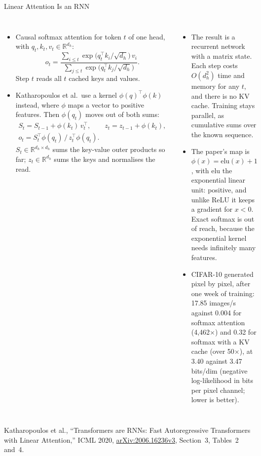 \begin{frame}{Linear Attention Is an RNN}
  \begin{columns}[T,onlytextwidth]
      \begin{itemize}\footnotesize\itemsep0.3em
        \item[\textcolor{red}{$\blacktriangleright$}] Causal softmax attention for token $t$ of one head, with $q_t, k_t, v_t \in \mathbb{R}^{d_h}$:
          \[ o_t = \frac{\sum_{i\leq t} \exp\!\big(q_t^\top k_i/\sqrt{d_h}\big)\, v_i}{\sum_{j\leq t} \exp\!\big(q_t^\top k_j/\sqrt{d_h}\big)}. \]
          Step $t$ reads all $t$ cached keys and values.
        \item[\textcolor{red}{$\blacktriangleright$}] Katharopoulos et al.\ use a kernel $\phi(q)^\top\phi(k)$ instead, where $\phi$ maps a vector to positive features. Then $\phi(q_t)$ moves out of both sums:
          \begin{gather*}
            S_t = S_{t-1} + \phi(k_t)\,v_t^\top, \qquad z_t = z_{t-1} + \phi(k_t),\\
            o_t = S_t^\top \phi(q_t) \,/\, z_t^\top \phi(q_t).
          \end{gather*}
          $S_t \in \mathbb{R}^{d_h\times d_h}$ sums the key-value outer products so far; $z_t \in \mathbb{R}^{d_h}$ sums the keys and normalises the read.
      \end{itemize}
      \begin{itemize}\footnotesize\itemsep0.4em
        \item[\textcolor{red}{$\blacktriangleright$}] The result is a recurrent network with a matrix state. Each step costs $O(d_h^2)$ time and memory for any $t$, and there is no KV cache. Training stays parallel, as cumulative sums over the known sequence.
        \item[\textcolor{red}{$\blacktriangleright$}] The paper's map is $\phi(x) = \mathrm{elu}(x) + 1$, with elu the exponential linear unit: positive, and unlike ReLU it keeps a gradient for $x < 0$. Exact softmax is out of reach, because the exponential kernel needs infinitely many features.
        \item[\textcolor{red}{$\blacktriangleright$}] CIFAR-10 generated pixel by pixel, after one week of training: 17.85 images/s against 0.004 for softmax attention (4,462$\times$) and 0.32 for softmax with a KV cache (over 50$\times$), at 3.40 against 3.47 bits/dim (negative log-likelihood in bits per pixel channel; lower is better).
      \end{itemize}
  \end{columns}
  \vspace{0.1em}
  {\scriptsize Katharopoulos et al., ``Transformers are RNNs: Fast Autoregressive Transformers with Linear Attention,'' ICML 2020, \href{https://arxiv.org/abs/2006.16236v3}{arXiv:2006.16236v3}, Section~3, Tables~2 and~4.}
\end{frame}

